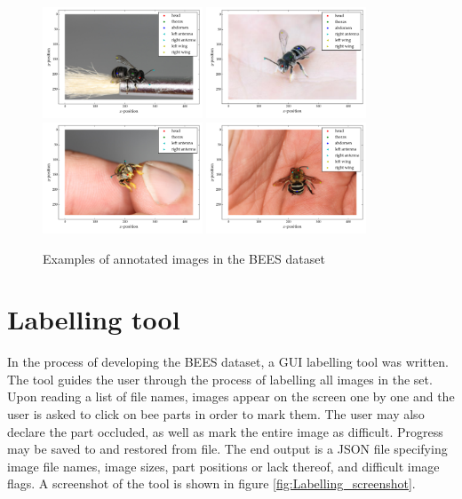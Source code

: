 \documentclass[11pt, oneside]{report}
\begin{document}
\begin{figure}[h]
    \centering
    \includegraphics[width=0.424\textwidth]{b1.pdf}\hfill
    \includegraphics[width=0.424\textwidth]{b2.pdf}
    \includegraphics[width=0.424\textwidth]{b3.pdf}\hfill
    \includegraphics[width=0.424\textwidth]{b4.pdf}
    \caption{Examples of annotated images in the BEES dataset}
    \label{fig:BEES_examples}
\end{figure}

\chapter{Labelling tool}
    In the process of developing the BEES dataset, a GUI labelling tool was written. The tool guides the user through the process of labelling all images in the set. Upon reading a list of file names, images appear on the screen one by one and the user is asked to click on bee parts in order to mark them. The user may also declare the part occluded, as well as mark the entire image as difficult. Progress may be saved to and restored from file. The end output is a JSON file specifying image file names, image sizes, part positions or lack thereof, and difficult image flags. A screenshot of the tool is shown in figure \ref{fig:Labelling_screenshot}.
\end{document}

